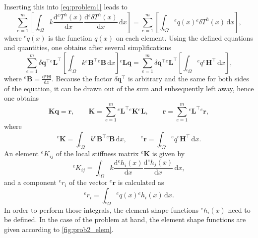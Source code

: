 \documentclass[a4paper,11pt]{article}
\numberwithin{equation}{section}
\newcommand\matr[1]{\ensuremath{\boldsymbol{\mathbf{#1}}}}
\newcommand\vect[1]{\ensuremath{\bm{#1}}}
\begin{document}
{\begin{equation}
\end{equation}
Inserting this into \cref{eq:problem1} leads to \begin{equation}
	\sum_{e=1}^{m} \left[\int_{^e\Omega} k \frac{\mathrm{d}{}^e T^h(x)}{\mathrm{d}x}\frac{\mathrm{d}{}^e \delta T^h(x)}{\mathrm{d}x}\,\mathrm{d}x\right] = \sum_{e=1}^{m}\left[\int_{^e\Omega}{}^eq(x){}^e\delta T^h(x)\,\mathrm{d}x\right],
\end{equation} where $^eq(x)$ is the function $q(x)$ on each element. Using the defined equations and quantities, one obtains after several simplifications \begin{equation}
	\sum_{e=1}^{m}\delta \vect{q}^\top {}^e\matr{L}^\top \left[\int_{{}^e\Omega}k {}^e\vect{B}^\top {}^e\vect{B}\,\mathrm{d}x\right]{}^e\matr{L}\vect{q} = \sum_{e=1}^{m}\delta \vect{q}^\top {}^e\matr{L}^\top \left[\int_{{}^e\Omega}{} ^eq{}^e\vect{H}^\top\,\mathrm{d}x\right],
\end{equation} where ${}^e\vect{B} = \frac{\mathrm{d} {}^e\vect{H}}{\mathrm{d}x}$. Because the factor $\delta \vect{q}^\top$ is arbitrary and the same for both sides of the equation, it can be drawn out of the sum and subsequently left away, hence one obtains \begin{equation}
	\matr{K}\vect{q} = \vect{r}, \qquad \matr{K} = \sum_{e=1}^{m} {}^e\matr{L}^\top {}^e\matr{K} {}^e\matr{L}, \qquad \vect{r} = \sum_{e=1}^{m} {}^e\matr{L}^\top {}^e\vect{r},
\end{equation} where \begin{equation}
	{}^e\matr{K} = \int_{{}^e\Omega} k {}^e\vect{B}^\top {}^e\vect{B}\,\mathrm{d}x, \qquad {}^e\vect{r} = \int_{{}^e\Omega} {}^eq {}^e\vect{H}^\top \,\mathrm{d}x.
\end{equation}
An element ${}^e K_{ij}$ of the local stiffness matrix $^e\matr{K}$ is given by \begin{equation}\label{eq:int_K}
	{}^e K_{ij} = \int_{{}^e\Omega} k \frac{\mathrm{d}{}^e h_i(x)}{\mathrm{d}x}\frac{\mathrm{d}{}^e h_j(x)}{\mathrm{d}x}\,\mathrm{d}x,
\end{equation} and a component $^e r_i$ of the vector $^e\vect{r}$ is calculated as \begin{equation}\label{eq:int_r}
	^e r_i = \int_{{}^e\Omega} {}^e q(x) {}^e h_i(x)\,\mathrm{d}x.
\end{equation} In order to perform those integrals, the element shape functions $^e h_i(x)$ need to be defined. In the case of the problem at hand, the element shape functions are given according to \cref{fig:prob2_elem}.
\begin{figure}[h]

\end{figure}}
\end{document}
